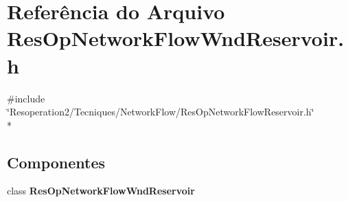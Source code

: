 \section{Referência do Arquivo Res\+Op\+Network\+Flow\+Wnd\+Reservoir.\+h}
\label{_res_op_network_flow_wnd_reservoir_8h}
{\ttfamily \#include \char`\"{}Resoperation2/\+Tecniques/\+Network\+Flow/\+Res\+Op\+Network\+Flow\+Reservoir.\+h\char`\"{}}\\*
\subsection*{Componentes}
\begin{DoxyCompactItemize}
\item 
class {\bf Res\+Op\+Network\+Flow\+Wnd\+Reservoir}
\end{DoxyCompactItemize}
